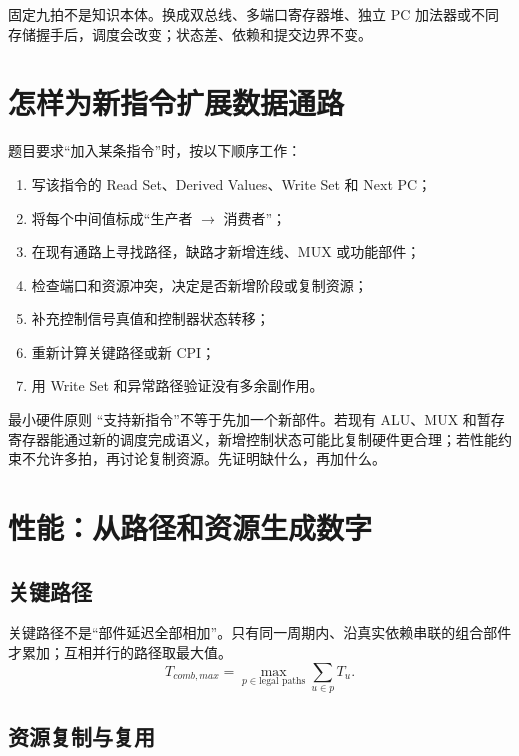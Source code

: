 \documentclass[UTF8,fontset=fandol,11pt,a4paper]{ctexart}
\begin{document}
固定九拍不是知识本体。换成双总线、多端口寄存器堆、独立 PC 加法器或不同存储握手后，调度会改变；状态差、依赖和提交边界不变。

\section{怎样为新指令扩展数据通路}

题目要求“加入某条指令”时，按以下顺序工作：
\begin{enumerate}
  \item 写该指令的 Read Set、Derived Values、Write Set 和 Next PC；
  \item 将每个中间值标成“生产者 $\to$ 消费者”；
  \item 在现有通路上寻找路径，缺路才新增连线、MUX 或功能部件；
  \item 检查端口和资源冲突，决定是否新增阶段或复制资源；
  \item 补充控制信号真值和控制器状态转移；
  \item 重新计算关键路径或新 CPI；
  \item 用 Write Set 和异常路径验证没有多余副作用。
\end{enumerate}

\begin{methodbox}{最小硬件原则}
“支持新指令”不等于先加一个新部件。若现有 ALU、MUX 和暂存寄存器能通过新的调度完成语义，新增控制状态可能比复制硬件更合理；若性能约束不允许多拍，再讨论复制资源。先证明缺什么，再加什么。
\end{methodbox}

\section{性能：从路径和资源生成数字}

\subsection{关键路径}

关键路径不是“部件延迟全部相加”。只有同一周期内、沿真实依赖串联的组合部件才累加；互相并行的路径取最大值。
\[
T_{comb,max}=\max_{p\in\text{legal paths}}\sum_{u\in p}T_u.
\]

\subsection{资源复制与复用}
\end{document}
